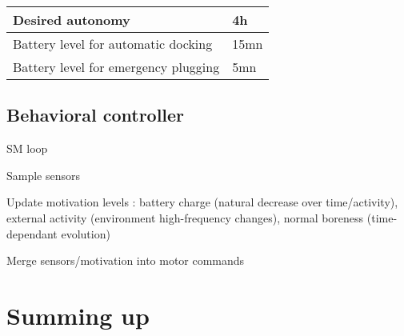 \documentclass{report}
\begin{document}
\begin{center}
  \begin{tabular}{l | l }
    Desired autonomy & 4h \\ \hline
    Battery level for automatic docking  & 15mn\\ \hline
    Battery level for emergency plugging  & 5mn\\
  \end{tabular}
\end{center}

\subsection{Behavioral controller}

SM loop

Sample sensors

Update motivation levels : battery charge (natural decrease over time/activity), external activity (environment high-frequency changes), normal boreness (time-dependant evolution)

Merge sensors/motivation into motor commands

\section{Summing up}
\end{document}
